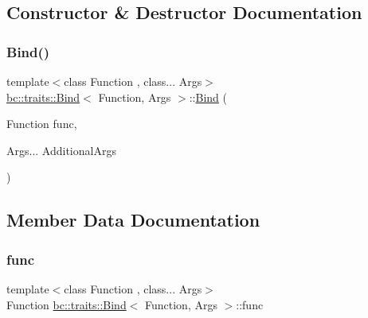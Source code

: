 \subsection{Constructor \& Destructor Documentation}
\mbox{\label{structbc_1_1traits_1_1Bind_a1969900854a26d59661d5b9c159d7fc4}} 
\subsubsection{\texorpdfstring{Bind()}{Bind()}}
{\footnotesize\ttfamily template$<$class Function , class... Args$>$ \\
\hyperlink{structbc_1_1traits_1_1Bind}{bc\+::traits\+::\+Bind}$<$ Function, Args $>$\+::\hyperlink{structbc_1_1traits_1_1Bind}{Bind} (\begin{DoxyParamCaption}\item[{Function}]{func,  }\item[{Args...}]{Additional\+Args }\end{DoxyParamCaption})\hspace{0.3cm}{\ttfamily [inline]}}



\subsection{Member Data Documentation}
\mbox{\label{structbc_1_1traits_1_1Bind_ac7c74786597ebc607ba416eb842a184d}} 
\subsubsection{\texorpdfstring{func}{func}}
{\footnotesize\ttfamily template$<$class Function , class... Args$>$ \\
Function \hyperlink{structbc_1_1traits_1_1Bind}{bc\+::traits\+::\+Bind}$<$ Function, Args $>$\+::func}

\mbox{\label{structbc_1_1traits_1_1Bind_a77891c8bf25f4fc19e2b226cf906a7a8}} 
